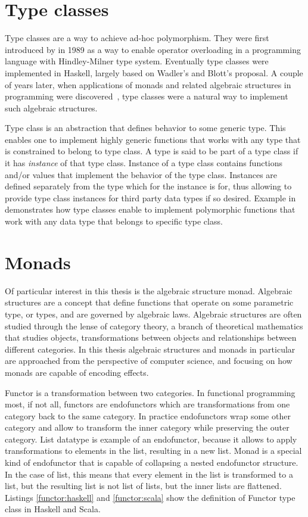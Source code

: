 \section{Type classes}
Type classes are a way to achieve ad-hoc polymorphism. They were first introduced by \textcite{ad-hoc-less-ad-hoc} in 1989 as a way to enable operator overloading in a programming language with Hindley-Milner type system. Eventually type classes were implemented in Haskell, largely based on Wadler's and Blott's proposal. A couple of years later, when applications of monads and related algebraic structures in programming were discovered~\cite{comp-lambda-monads}, type classes were a natural way to implement such algebraic structures.

Type class is an abstraction that defines behavior to some generic type. This enables one to implement highly generic functions that works with any type that is constrained to belong to type class. A type is said to be part of a type class if it has \textit{instance} of that type class. Instance of a type class contains functions and/or values that implement the behavior of the type class. Instances are defined separately from the type which for the instance is for, thus allowing to provide type class instances for third party data types if so desired. Example in  demonstrates how type classes enable to implement polymorphic functions that work with any data type that belongs to specific type class.




\section{Monads} \label{background:monads}
Of particular interest in this thesis is the algebraic structure monad. Algebraic structures are a concept that define functions that operate on some parametric type, or types, and are governed by algebraic laws. Algebraic structures are often studied through the lense of category theory, a branch of theoretical mathematics that studies objects, transformations between objects and relationships between different categories. In this thesis algebraic structures and monads in particular are approached from the perspective of computer science, and focusing on how monads are capable of encoding effects.

Functor is a transformation between two categories. In functional programming most, if not all, functors are endofunctors which are transformations from one category back to the same category. In practice endofunctors wrap some other category and allow to transform the inner category while preserving the outer category. List datatype is example of an endofunctor, because it allows to apply transformations to elements in the list, resulting in a new list. Monad is a special kind of endofunctor that is capable of collapsing a nested endofunctor structure. In the case of list, this means that every element in the list is transformed to a list, but the resulting list is not list of lists, but the inner lists are flattened. Listings \ref{functor:haskell} and \ref{functor:scala} show the definition of Functor type class in Haskell and Scala.


